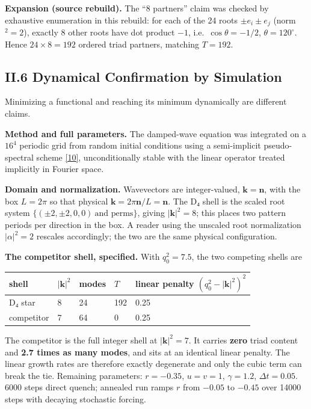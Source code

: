 \documentclass[a4paper,11pt]{article}
\newcommand{\expansion}[1]{\par\smallskip\noindent\textbf{Expansion (source rebuild).} #1\par\smallskip}
\begin{document}
\expansion{The ``8 partners'' claim was checked by exhaustive enumeration in this rebuild: for each of the 24 roots $\pm e_i \pm e_j$ (norm$^2 = 2$), exactly 8 other roots have dot product $-1$, i.e.\ $\cos\theta = -1/2$, $\theta = 120^\circ$. Hence $24 \times 8 = 192$ ordered triad partners, matching $T = 192$.}
\subsection*{II.6 Dynamical Confirmation by Simulation}

Minimizing a functional and reaching its minimum dynamically are different claims.

\textbf{Method and full parameters.} The damped-wave equation was integrated on a $16^4$ periodic grid from random initial conditions using a semi-implicit pseudo-spectral scheme \hyperref[ref10]{[10]}, unconditionally stable with the linear operator treated implicitly in Fourier space.

\textbf{Domain and normalization.} Wavevectors are integer-valued, $\mathbf{k}=\mathbf{n}$, with the box $L=2\pi$ so that physical $\mathbf{k}=2\pi\mathbf{n}/L=\mathbf{n}$. The D₄ shell is the scaled root system $\{(\pm2,\pm2,0,0)\ \text{and perms}\}$, giving $|\mathbf{k}|^2=8$; this places two pattern periods per direction in the box. A reader using the unscaled root normalization $|\alpha|^2=2$ rescales accordingly; the two are the same physical configuration.

\textbf{The competitor shell, specified.} With $q_0^2=7.5$, the two competing shells are

\begin{center}
\begin{tabular}{lllll}
\hline
shell & $|\mathbf{k}|^2$ & modes & $T$ & linear penalty $(q_0^2-|\mathbf{k}|^2)^2$ \\
\hline
D₄ star & 8 & 24 & 192 & 0.25 \\
competitor & 7 & 64 & 0 & 0.25 \\
\hline
\end{tabular}
\end{center}

The competitor is the full integer shell at $|\mathbf{k}|^2=7$. It carries \textbf{zero} triad content and \textbf{2.7 times as many modes}, and sits at an identical linear penalty. The linear growth rates are therefore exactly degenerate and only the cubic term can break the tie. Remaining parameters: $r=-0.35$, $u=v=1$, $\gamma=1.2$, $\Delta t=0.05$. 6000 steps direct quench; annealed run ramps $r$ from $-0.05$ to $-0.45$ over 14000 steps with decaying stochastic forcing.
\end{document}
